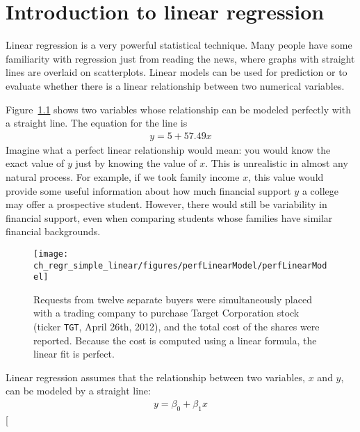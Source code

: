 \chapter{Introduction to linear regression}
\label{linRegrForTwoVar}


Linear regression is a very powerful statistical technique. Many people have some familiarity with regression just from reading the news, where graphs with straight lines are overlaid on scatterplots. Linear models can be used for prediction or to evaluate whether there is a linear relationship between two numerical variables.

Figure~\ref{perfLinearModel} shows two variables whose relationship can be modeled perfectly with a straight line. The equation for the line is
\begin{eqnarray*}
y = 5 + 57.49x
\end{eqnarray*}
Imagine what a perfect linear relationship would mean: you would know the exact value of $y$ just by knowing the value of $x$. This is unrealistic in almost any natural process. For example, if we took family income $x$, this value would provide some useful information about how much financial support $y$ a college may offer a prospective student. However, there would still be variability in financial support, even when comparing students whose families have similar financial backgrounds.

\begin{figure}
   \centering
   \texttt{[image: ch\_regr\_simple\_linear/figures/perfLinearModel/perfLinearModel]}
   \caption{Requests from twelve separate buyers were simultaneously placed with a trading company to purchase Target Corporation stock (ticker \texttt{TGT}, April 26th, 2012), and the total cost of the shares were reported. Because the cost is computed using a linear formula, the linear fit is perfect.}
   \label{perfLinearModel}
\end{figure}

Linear regression assumes that the relationship between two variables, $x$ and $y$, can be modeled by a straight line:
\begin{eqnarray}
y = \beta_0 + \beta_1x
\label{genLinModelWNoErrorTerm}
\end{eqnarray}
\marginpar[\raggedright\vspace{-10mm}

